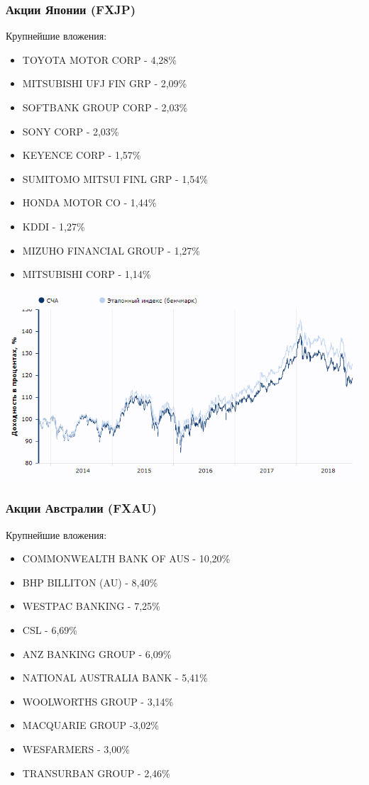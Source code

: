 \subsubsection{Акции Японии (FXJP)}

Крупнейшие вложения:

\begin{itemize}
	\item TOYOTA MOTOR CORP - 4,28\%
	\item MITSUBISHI UFJ FIN GRP - 2,09\%
	\item SOFTBANK GROUP CORP - 2,03\%
	\item SONY CORP - 2,03\%
	\item KEYENCE CORP - 1,57\%
	\item SUMITOMO MITSUI FINL GRP - 1,54\%
	\item HONDA MOTOR CO - 1,44\%
	\item KDDI - 1,27\%
	\item MIZUHO FINANCIAL GROUP - 1,27\%
	\item MITSUBISHI CORP - 1,14\%
\end{itemize}

\includegraphics[width=16cm]{pics/alina/japan.png}

\subsubsection{Акции Австралии (FXAU)}

Крупнейшие вложения:

\begin{itemize}
	\item COMMONWEALTH BANK OF AUS - 10,20\%
	\item BHP BILLITON (AU) - 8,40\%
	\item WESTPAC BANKING - 7,25\%
	\item CSL - 6,69\%
	\item ANZ BANKING GROUP - 6,09\%
	\item NATIONAL AUSTRALIA BANK - 5,41\%
	\item WOOLWORTHS GROUP - 3,14\%
	\item MACQUARIE GROUP -3,02\%
	\item WESFARMERS - 3,00\%
	\item TRANSURBAN GROUP - 2,46\%
\end{itemize}

